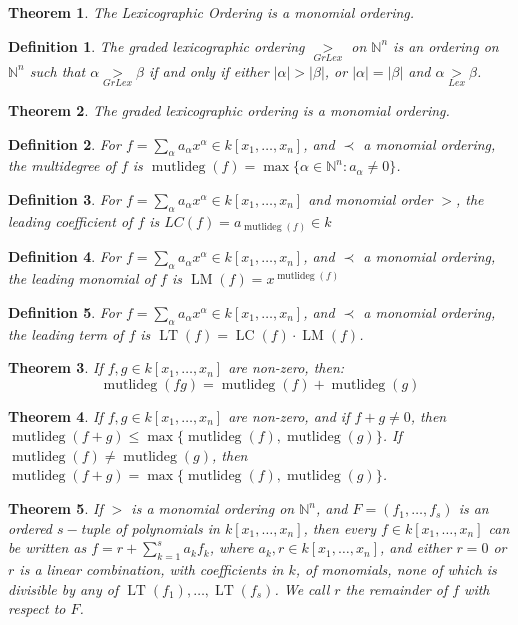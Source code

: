 \documentclass{article}
\theoremstyle{mystyle}
\newtheorem{theorem}{Theorem}[section]
\newtheorem{definition}{Definition}[section]
\DeclareMathOperator{\multideg}{mutlideg}
\DeclareMathOperator{\LC}{LC}
\DeclareMathOperator{\LT}{LT}
\DeclareMathOperator{\LM}{LM}
\begin{document}
\begin{theorem}
The Lexicographic Ordering is a monomial ordering.
\end{theorem}
\begin{definition}
The graded lexicographic ordering $\underset{GrLex}{>}$ on $\mathbb{N}^n$ is an ordering on $\mathbb{N}^n$ such that $\alpha \underset{GrLex}{>}\beta$ if and only if either $|\alpha|>|\beta|$, or $|\alpha| = |\beta|$ and $\alpha \underset{Lex}{>}\beta$.
\end{definition}
\begin{theorem}
The graded lexicographic ordering is a monomial ordering.
\end{theorem}
\begin{definition}
For $f=\sum_{\alpha} a_{\alpha} x^\alpha \in k[x_1,\hdots ,x_n]$, and $\prec$ a monomial ordering, the multidegree of $f$ is $\multideg(f) = \max\{\alpha\in\mathbb{N}^n: a_{\alpha} \ne 0\}$.
\end{definition}
\begin{definition}
For $f=\sum_{\alpha}a_\alpha x^\alpha \in k[x_1,\hdots ,x_n]$ and monomial order $>$, the leading coefficient of $f$ is $LC(f) =a_{\multideg(f)}\in k$
\end{definition}
\begin{definition}
For $f=\sum_{\alpha} a_{\alpha} x^\alpha \in k[x_1,\hdots ,x_n]$, and $\prec$ a monomial ordering, the leading monomial of $f$ is $\LM(f) = x^{\multideg(f)}$
\end{definition}
\begin{definition}
For $f=\sum_{\alpha} a_{\alpha} x^{\alpha} \in k[x_1,\hdots ,x_n]$, and $\prec$ a monomial ordering, the leading term of $f$ is $\LT(f) = \LC(f)\cdot \LM(f)$.
\end{definition}
\begin{theorem}
If $f,g\in k[x_1,\hdots ,x_n]$ are non-zero, then:
\begin{equation*}
    \multideg(fg) = \multideg(f)+\multideg(g)
\end{equation*}
\end{theorem}
\begin{theorem}
If $f,g\in k[x_1,\hdots ,x_n]$ are non-zero, and if $f+g \ne 0$, then $\multideg(f+g) \leq \max\{\multideg(f),\multideg(g)\}$. If $\multideg(f)\ne \multideg(g)$, then $\multideg(f+g) = \max\{\multideg(f),\multideg(g)\}$.
\end{theorem}
\begin{theorem}
If $>$ is a monomial ordering on $\mathbb{N}^n$, and $F = (f_1,\hdots, f_s)$ is an ordered $s-$tuple of polynomials in $k[x_1,\hdots ,x_n]$, then every $f\in k[x_1,\hdots ,x_n]$ can be written as $f = r+\sum_{k=1}^{s} a_k f_k$, where $a_k,r\in k[x_1,\hdots ,x_n]$, and either $r=0$ or $r$ is a linear combination, with coefficients in $k$, of monomials, none of which is divisible by any of $\LT(f_1),\hdots, \LT(f_s)$. We call $r$ the remainder of $f$ with respect to $F$.
\end{theorem}
\end{document}
